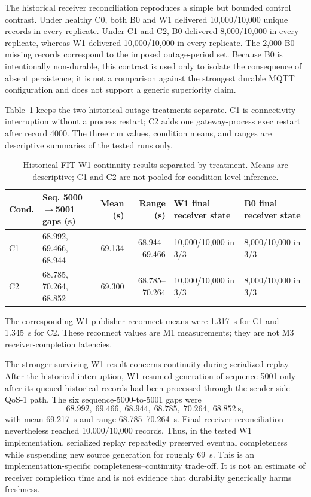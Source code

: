 \documentclass[journal]{IEEEtran}
\begin{document}
The historical receiver reconciliation reproduces a simple but bounded control contrast. Under healthy C0, both B0 and W1 delivered 10,000/10,000 unique records in every replicate. Under C1 and C2, B0 delivered 8,000/10,000 in every replicate, whereas W1 delivered 10,000/10,000 in every replicate. The 2,000 B0 missing records correspond to the imposed outage-period set. Because B0 is intentionally non-durable, this contrast is used only to isolate the consequence of absent persistence; it is not a comparison against the strongest durable MQTT configuration and does not support a generic superiority claim.

Table~\ref{tab:historicalsplit} keeps the two historical outage treatments separate. C1 is connectivity interruption without a process restart; C2 adds one gateway-process exec restart after record 4000. The three run values, condition means, and ranges are descriptive summaries of the tested runs only.

\begin{table}[t]
\centering
\small
\caption{Historical FIT W1 continuity results separated by treatment. Means are descriptive; C1 and C2 are not pooled for condition-level inference.}
\label{tab:historicalsplit}
\setlength{\tabcolsep}{4pt}
\begin{tabular}{@{}lp{}rrp{}p{}@{}}
\toprule
\textbf{Cond.} & \textbf{Seq. 5000$\rightarrow$5001 gaps (s)} & \textbf{Mean (s)} & \textbf{Range (s)} & \textbf{W1 final receiver state} & \textbf{B0 final receiver state} \\
\midrule
C1 & 68.992, 69.466, 68.944 & 69.134 & 68.944--69.466 & 10,000/10,000 in 3/3 & 8,000/10,000 in 3/3 \\
C2 & 68.785, 70.264, 68.852 & 69.300 & 68.785--70.264 & 10,000/10,000 in 3/3 & 8,000/10,000 in 3/3 \\
\bottomrule
\end{tabular}
\end{table}

The corresponding W1 publisher reconnect means were 1.317~s for C1 and 1.345~s for C2. These reconnect values are M1 measurements; they are not M3 receiver-completion latencies.

The stronger surviving W1 result concerns continuity during serialized replay. After the historical interruption, W1 resumed generation of sequence 5001 only after its queued historical records had been processed through the sender-side QoS-1 path. The six sequence-5000-to-5001 gaps were
\[
68.992,\;69.466,\;68.944,\;68.785,\;70.264,\;68.852~\mathrm{s},
\]
with mean 69.217~s and range 68.785--70.264~s. Final receiver reconciliation nevertheless reached 10,000/10,000 records. Thus, in the tested W1 implementation, serialized replay repeatedly preserved eventual completeness while suspending new source generation for roughly 69~s. This is an implementation-specific completeness--continuity trade-off. It is not an estimate of receiver completion time and is not evidence that durability generically harms freshness.
\end{document}
